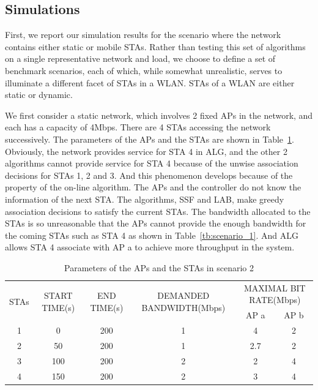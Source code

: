 \documentclass[conference]{IEEEtran}
\begin{document}
  \subsection{Simulations}
  First, we report our simulation results for the scenario where the network contains either static or mobile STAs.  Rather than testing this set of algorithms on a single representative network and load, we choose to define a set of benchmark scenarios, each of which, while somewhat unrealistic, serves to illuminate a different facet of STAs in a WLAN.  STAs of a WLAN are either static or dynamic.

  We first consider a static network, which involves 2 fixed APs in the network, and each has a capacity of 4Mbps.  There are 4 STAs accessing the network successively.  The parameters of the APs and the STAs are shown in Table~\ref{tb:parameter_scenario_1}.  Obviously, the network provides service for STA 4 in ALG, and the other 2 algorithms cannot provide service for STA 4 because of the unwise association decisions for STAs 1, 2 and 3.  And this phenomenon develops because of the property of the on-line algorithm.  The APs and the controller do not know the information of the next STA. The algorithms, SSF and LAB, make greedy association decisions to satisfy the current STAs.  The bandwidth allocated to the STAs is so unreasonable that the APs cannot provide the enough bandwidth for the coming STAs such as STA 4 as shown in Table~\ref{tb:scenario_1}.  And ALG allows STA 4 associate with  AP a to achieve more throughput in the system.

  \begin{table}
  \centering
  \caption{Parameters of the APs and the STAs in scenario 2}\label{tb:parameter_scenario_1}
    \begin{tabular}{|c|c|c|c|c|c|}
      \hline
      \multirow{2}{*}{STAs} & \multirow{2}{*}{START TIME(s)} & \multirow{2}{*}{END TIME(s)} & \multirow{2}{*}{DEMANDED BANDWIDTH(Mbps)} &\multicolumn{2}{|c|}{MAXIMAL BIT RATE(Mbps)}\\
      \cline{5-6}
       &&&& AP a & AP b\\
      \hline
      1  & 0 & 200 & 1 & 4 & 2 \\
      \hline
      2 & 50 & 200 & 1 & 2.7 & 2\\
      \hline
      3 & 100 & 200 & 2 & 2 & 4\\
      \hline
      4 & 150 & 200 & 2 & 3 & 4\\
      \hline
    \end{tabular}
  \end{table}
\end{document}
